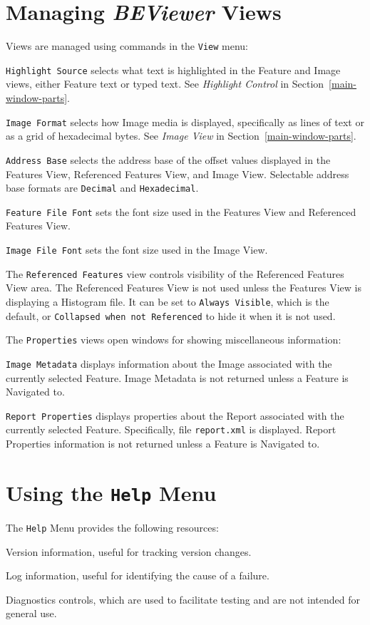 \documentclass[10pt,twoside]{article}
\newcommand{\bev}{\emph{BEViewer}\xspace}
\begin{document}
\section{Managing \bev Views}
Views are managed using commands in the \texttt{View} menu:
\begin{compactitem}
\item \texttt{Highlight Source} selects what text is highlighted in the Feature and Image views,
either Feature text or typed text.  See \emph{Highlight Control} in Section~\ref{main-window-parts}.
\item \texttt{Image Format} selects how Image media is displayed,
specifically as lines of text or as a grid of hexadecimal bytes.
See \emph{Image View} in Section~\ref{main-window-parts}.
\item \texttt{Address Base} selects the address base of the offset values
displayed in the Features View, Referenced Features View, and Image View.
Selectable address base formats are \texttt{Decimal} and \texttt{Hexadecimal}.
\item \texttt{Feature File Font}
sets the font size used in the Features View and Referenced Features View.
\item \texttt{Image File Font}
sets the font size used in the Image View.
\item The \texttt{Referenced Features}
view controls visibility of the Referenced Features View area.
The Referenced Features View is not used unless the Features View is displaying a Histogram file.
It can be set to \texttt{Always Visible}, which is the default,
or \texttt{Collapsed when not Referenced} to hide it when it is not used.
\item The \texttt{Properties} views open windows for showing miscellaneous information:
\begin{compactitem}
\item \texttt{Image Metadata} displays information about the Image
associated with the currently selected Feature.
Image Metadata is not returned unless a Feature is Navigated to.
\item \texttt{Report Properties} displays properties about the Report
associated with the currently selected Feature.
Specifically, file \texttt{report.xml} is displayed.
Report Properties information is not returned unless a Feature is Navigated to.
\end{compactitem}
\end{compactitem}

\section{Using the \texttt{Help} Menu}
The \texttt{Help} Menu provides the following resources:
\begin{compactitem}
\item Version information, useful for tracking version changes.
\item Log information, useful for identifying the cause of a failure.
\item Diagnostics controls,
which are used to facilitate testing and are not intended for general use.
\end{compactitem}
\end{document}

